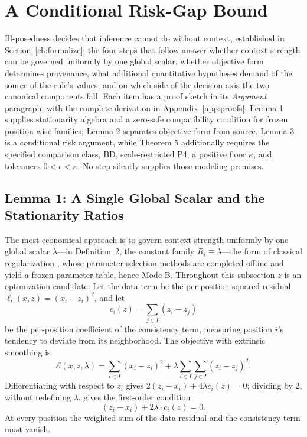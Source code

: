 \documentclass[twoside,11pt]{article}
\begin{document}
\section{A Conditional Risk-Gap Bound}
\label{ch:bound}%

Ill-posedness decides that inference cannot do without context, established in Section~\ref{ch:formalize}; the four steps that follow answer whether context strength can be governed uniformly by one global scalar, whether objective form determines provenance, what additional quantitative hypotheses demand of the source of the rule's values, and on which side of the decision axis the two canonical components fall. Each item has a proof sketch in its \emph{Argument} paragraph, with the complete derivation in Appendix~\ref{app:proofs}. Lemma 1 supplies stationarity algebra and a zero-safe compatibility condition for frozen position-wise families; Lemma 2 separates objective form from source. Lemma 3 is a conditional risk argument, while Theorem 5 additionally requires the specified comparison class, BD, scale-restricted P4, a positive floor $\kappa$, and tolerances $0<\epsilon<\kappa$. No step silently supplies those modeling premises.

\subsection{Lemma 1: A Single Global Scalar and the Stationarity Ratios}

The most economical approach is to govern context strength uniformly by one global scalar $\lambda$---in Definition~2, the constant family $R_i \equiv \lambda$---the form of classical regularization \citep{poggio1985}, whose parameter-selection methods are completed offline and yield a frozen parameter table, hence Mode B. Throughout this subsection $z$ is an optimization candidate. Let the data term be the per-position squared residual $\ell_i(x,z) = (x_i - z_i)^2$, and let
\begin{equation}
c_i (z) = \sum_{j \in I} (z_i - z_j)
\label{eq:kappa}%
\end{equation}%
be the per-position coefficient of the consistency term, measuring position $i$'s tendency to deviate from its neighborhood. The objective with extrinsic smoothing is
\begin{equation}
\mathcal{E}(x, z, \lambda) = \sum_{i \in I} (x_i - z_i)^2 + \lambda \sum_{i \in I} \sum_{j \in I} (z_i - z_j)^2 .
\label{eq:paradigmE}%
\end{equation}%
Differentiating with respect to $z_i$ gives $2(z_i-x_i)+4\lambda c_i(z)=0$; dividing by $2$, without redefining $\lambda$, gives the first-order condition
\begin{equation}
(z_i - x_i) + 2\lambda \cdot c_i (z) = 0 .
\label{eq:foc}%
\end{equation}%
At every position the weighted sum of the data residual and the consistency term must vanish.
\end{document}
